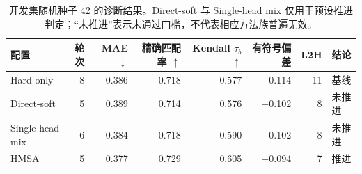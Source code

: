\begin{table}[H]
\centering
\caption{开发集随机种子 42 的诊断结果。Direct-soft 与 Single-head mix 仅用于预设推进判定；“未推进”表示未通过门槛，不代表相应方法族普遍无效。}
\label{tab:diagnostic_seed42}
\small
\begin{tabular}{lrrrrrrl}
\toprule
配置 & 轮次 & MAE $\downarrow$ & 精确匹配率 $\uparrow$ & Kendall $\tau_b$ $\uparrow$ & 有符号偏差 & L2H & 结论 \\
\midrule
Hard-only & 8 & 0.386 & 0.718 & 0.577 & +0.114 & 11 & 基线 \\
Direct-soft & 5 & 0.389 & 0.714 & 0.576 & +0.102 & 8 & 未推进 \\
Single-head mix & 6 & 0.384 & 0.718 & 0.590 & +0.102 & 8 & 未推进 \\
HMSA & 5 & 0.377 & 0.729 & 0.605 & +0.094 & 7 & 推进 \\
\bottomrule
\end{tabular}
\end{table}
